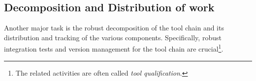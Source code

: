 \documentclass{template/openetcs_article}
\begin{document}

\subsection{Decomposition and Distribution of work}

Another major task is the robust decomposition of the tool chain and its 
distribution and tracking of the various components.  
Specifically, robust integration tests and version management for the tool chain are crucial\footnote{The related activities are often called {\it tool qualification}.}.



%
\end{document}
